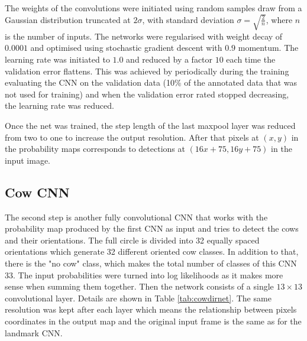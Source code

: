 \documentclass{cta-author}
\begin{document}
The weights of the convolutions were initiated using random samples draw from a Gaussian
distribution truncated at $2\sigma$, with standard deviation $\sigma=\sqrt{\frac{2}{n}}$,
where $n$ is the number of inputs\cite{DBLP:journals/corr/HeZR015}. The networks were regularised with weight
decay of
$0.0001$ and optimised using stochastic gradient descent with $0.9$ momentum. The
learning rate was initiated to $1.0$ and reduced by a factor $10$ each time the validation
error flattens. This was achieved by periodically during the training evaluating the CNN on the validation data
(10\% of the annotated data that was not used for training) and when the validation error rated stopped decreasing,
the learning rate was reduced.

Once the net was trained, the step length of the last maxpool layer was reduced from two to one to increase
the output resolution. After that pixels at $\left(x, y\right)$ in the probability maps corresponds to
detections at $\left(16 x + 75, 16 y + 75\right)$ in the input image.

\subsection{Cow CNN}

The second step is another fully convolutional CNN that works with the probability map produced by the first CNN
as input and tries to detect the cows and their orientations. The full circle is divided into 32 equally
spaced orientations which generate 32 different oriented cow classes. In addition to that, there is the "no
cow" class, which makes the total number of classes of this CNN 33. The input probabilities were turned into
log likelihoods as it makes more sense when summing them together. Then the network consists of a single $ 13
\times 13 $ convolutional layer. Details are shown in Table \ref{tab:cowdirnet}. The same resolution was kept
after each layer which means the relationship between pixels coordinates in the output map and the original
input frame is the same as for the landmark CNN.
\end{document}
